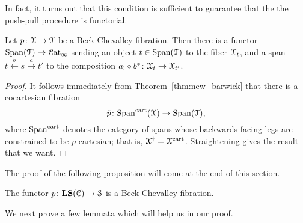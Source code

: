 \documentclass[main.tex]{subfiles}
\begin{document}
In fact, it turns out that this condition is sufficient to guarantee that the the push-pull procedure is functorial.

\begin{proposition}
  Let $p\colon \mathcal{X} \to \mathcal{T}$ be a Beck-Chevalley fibration. Then there is a functor $\mathrm{Span}(\mathcal{T}) \to \mathcal{C}\mathrm{at}_{\infty}$ sending an object $t \in \mathrm{Span}(\mathcal{T})$ to the fiber $\mathcal{X}_{t}$, and a span $t \overset{b}{\leftarrow} s \overset{a}{\rightarrow} t'$ to the composition $a_{!} \circ b^{*}\colon \mathcal{X}_{t} \to \mathcal{X}_{t'}$.
\end{proposition}
\begin{proof}
  It follows immediately from \hyperref[thm:new_barwick]{Theorem~\ref*{thm:new_barwick}} that there is a cocartesian fibration
  \begin{equation*}
    \tilde{p}\colon \mathrm{Span}^{\mathrm{cart}}(\mathcal{X}) \to \mathrm{Span}(\mathcal{T}),
  \end{equation*}
  where $\mathrm{Span}^{\mathrm{cart}}$ denotes the category of spans whose backwards-facing legs are constrained to be $p$-cartesian; that is, $\mathcal{X}^{\dagger} = \mathcal{X}^{\mathrm{cart}}$. Straightening gives the result that we want.
\end{proof}


The proof of the following proposition will come at the end of this section.

\begin{proposition}
  \label{prop:local_systems_are_beck_chevalley}
  The functor $p\colon \mathbf{LS}(\mathcal{C}) \to \mathcal{S}$ is a Beck-Chevalley fibration.
\end{proposition}

We next prove a few lemmata which will help us in our proof.
\end{document}
